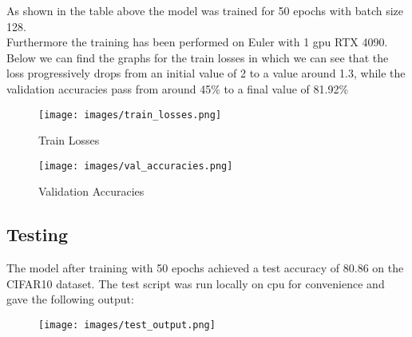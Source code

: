 \documentclass{ETHExercise}
\begin{document}
As shown in the table above the model was trained for 50 epochs with batch size 128.
\\
Furthermore the training has been performed on Euler with 1 gpu RTX 4090. 
\\
Below we can find the graphs for the train losses in which we can see that the 
loss progressively drops from an initial value of 2 to a value around 1.3, while the validation accuracies
pass from around 45\% to a final value of 81.92\%

\begin{figure}[h]
  \centering
  \texttt{[image: images/train\_losses.png]}
  \caption{Train Losses}
\end{figure}
\begin{figure}[h]
  \centering
  \texttt{[image: images/val\_accuracies.png]}
  \caption{Validation Accuracies}
\end{figure}

\newpage
\subsection{Testing}
The model after training with 50 epochs achieved a test accuracy of 80.86 on the CIFAR10 dataset.
The test script was run locally on cpu for convenience and gave the following output:
\begin{figure}[!h]
  \centering
  \texttt{[image: images/test\_output.png]}
\end{figure}
\end{document}

